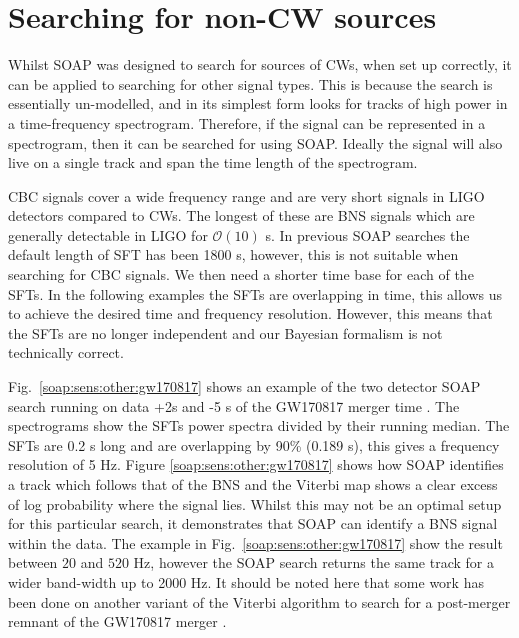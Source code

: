 \clearpage

\section{\label{soap:sens:other} Searching for non-CW sources}

Whilst SOAP was designed to search for sources of \glspl{CW}, when set up correctly, it can be applied to searching for other signal types.
This is because the search is essentially un-modelled, and in its simplest form looks for tracks of high power in a time-frequency spectrogram.
Therefore, if the signal can be represented in a spectrogram, then it can be
searched for using SOAP. 
Ideally the signal will also live on a single track and span the time length of the spectrogram. 

CBC signals cover a wide frequency range and are very short signals in \gls{LIGO} detectors compared to \glspl{CW}. 
The longest of these are \gls{BNS} signals which are generally detectable in \gls{LIGO} for $\mathcal{O}(10)$
s. 
In previous SOAP searches the default length of \gls{SFT} has been 1800 s, however, this is not suitable when searching for \gls{CBC} signals.
We then need a shorter time base for each of the \glspl{SFT}.
In the following examples the \glspl{SFT} are overlapping in time, this allows us to achieve the desired time and frequency resolution.
However, this means that the \glspl{SFT} are no longer independent and our Bayesian formalism is not technically correct.

Fig.~\ref{soap:sens:other:gw170817} shows an example of the two detector SOAP search running on data +2s and -5 s of the GW170817 merger time \citep{abbott2017GW170817Observation}. 
The spectrograms show the \glspl{SFT} power spectra divided by their
running median.
The \glspl{SFT} are 0.2 s long and are overlapping by 90\% (0.189 s), this gives a frequency resolution of 5 Hz. 
Figure \ref{soap:sens:other:gw170817} shows how SOAP identifies a track which
follows that of the \gls{BNS} and the Viterbi map shows a clear excess of log probability where the signal lies.
Whilst this may not be an optimal setup for this particular search, it demonstrates that SOAP can identify a \gls{BNS} signal within the data. 
The example in Fig.~\ref{soap:sens:other:gw170817} show the result between
$20$ and $520$ Hz, however the SOAP search returns the same track
for a wider band-width up to 2000 Hz.
It should be noted here that some work has been done on another variant of the Viterbi algorithm to search for a post-merger remnant of the GW170817 merger \citep{abbott2019SearchGravitational}.


